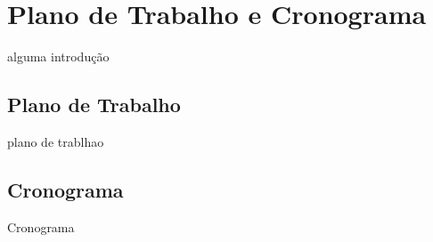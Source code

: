 \chapter{Plano de Trabalho e Cronograma}

alguma introdução

\section{Plano de Trabalho}

plano de trablhao

\section{Cronograma}

Cronograma